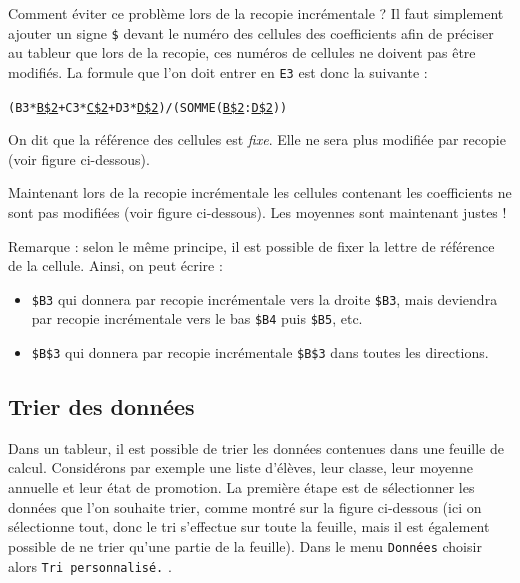 
Comment éviter ce problème lors de la recopie incrémentale ? Il faut simplement ajouter un signe \texttt{\$} devant le numéro des cellules des coefficients afin de préciser au tableur que lors de la recopie, ces numéros de cellules ne doivent pas être modifiés. La formule que l'on doit entrer en \texttt{E3} est donc la suivante :

\begin{center}\texttt{(B3*\underline{B\$2}+C3*\underline{C\$2}+D3*\underline{D\$2})/(SOMME(\underline{B\$2}:\underline{D\$2}))}\end{center}

On dit que la référence des cellules est \emph{fixe}. Elle ne sera plus modifiée par recopie (voir figure ci-dessous).


Maintenant lors de la recopie incrémentale les cellules contenant les coefficients ne sont pas modifiées (voir figure ci-dessous). Les moyennes sont maintenant justes !


Remarque : selon le même principe, il est possible de fixer la lettre de référence de la cellule. Ainsi, on peut écrire :

\begin{itemize}
	\item \texttt{\$B3} qui donnera par recopie incrémentale vers la droite \texttt{\$B3}, mais deviendra par recopie incrémentale vers le bas \texttt{\$B4} puis \texttt{\$B5}, etc.
	\item \texttt{\$B\$3} qui donnera par recopie incrémentale \texttt{\$B\$3} dans toutes les directions.
\end{itemize}

\subsection{Trier des données}\label{Calc3tri} 

Dans un tableur, il est possible de trier les données contenues dans une feuille de calcul. Considérons par exemple une liste d'élèves, leur classe, leur moyenne annuelle et leur état de promotion. La première étape est de sélectionner les données que l'on souhaite trier, comme montré sur la figure ci-dessous  (ici on sélectionne tout, donc le tri s'effectue sur toute la feuille, mais il est également possible de ne trier qu'une partie de la feuille). Dans le menu \texttt{Données}  choisir alors \texttt{Tri personnalisé.} .


